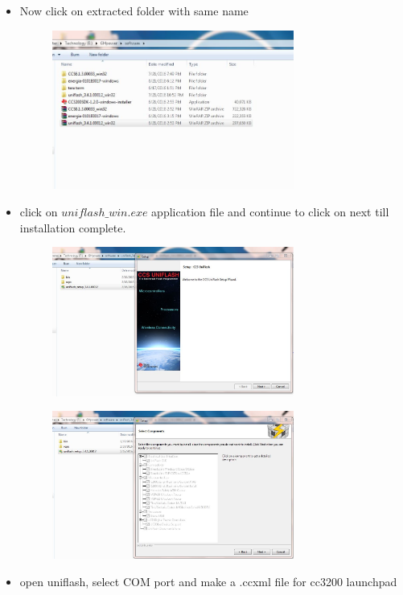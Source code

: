 \documentclass[a4paper,12pt,oneside]{book}
\begin{document}
\begin{enumerate}
\begin{itemize}
\begin{figure}[h]
    	\end{figure}
    \item Now click on extracted folder with same name
    \begin{figure}[h]
    	\hspace{2cm}
    	\includegraphics[width=300px]{inst10}
    \end{figure}
    \newpage
    \item click on $uniflash\_win.exe$ application file and continue to click on next till installation complete.
    \begin{figure}[h]
    	\hspace{2cm}
    	\includegraphics[width=300px]{inst11}
    \end{figure}
    \begin{figure}[h]
    	\hspace{2cm}
    	\includegraphics[width=300px]{inst12}
    \end{figure}
    \newpage
     \item open uniflash, select COM port and make a .ccxml file for cc3200 launchpad

\end{itemize}
\end{enumerate}
\end{document}
